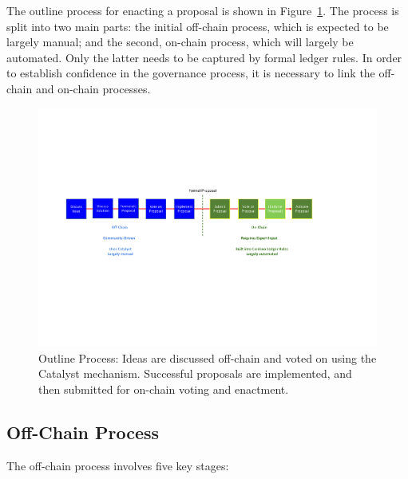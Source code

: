The outline process for enacting a proposal is shown in Figure~\ref{fig:workflows}.   The process is split into two main parts: the initial off-chain process, which is expected to be largely manual; and the second, on-chain process, which will largely be
automated.  Only the latter needs to be captured by formal ledger rules.  In order to establish confidence in the governance process,
it is necessary to link the off-chain and on-chain processes.

\begin{figure}
  \begin{center}
  \includegraphics[trim=30 250 100 150,clip,width=\textwidth]{StoryBoard}
  \end{center}
  \caption{Outline Process: Ideas are discussed off-chain and voted on using the Catalyst mechanism.  Successful proposals are implemented, and then submitted for on-chain voting and enactment.}
\label{fig:workflows}
\end{figure}


\newpage
\subsection{Off-Chain Process}

The off-chain process involves five key stages:


